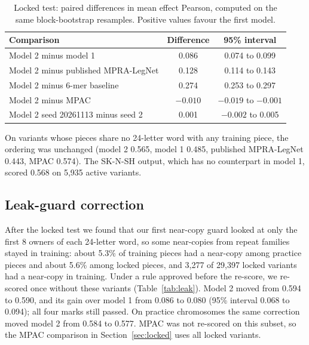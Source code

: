 \documentclass[11pt]{article}
\begin{document}
\begin{table}[tbp]
\centering
\caption{Locked test: paired differences in mean effect Pearson, computed on the same block-bootstrap resamples. Positive values favour the first model.}
\label{tab:diffs}
\small
\begin{tabular}{lcc}
\toprule
Comparison & Difference & 95\% interval \\
\midrule
Model 2 minus model 1 & 0.086 & 0.074 to 0.099 \\
Model 2 minus published MPRA-LegNet & 0.128 & 0.114 to 0.143 \\
Model 2 minus 6-mer baseline & 0.274 & 0.253 to 0.297 \\
Model 2 minus MPAC & $-0.010$ & $-0.019$ to $-0.001$ \\
Model 2 seed 20261113 minus seed 2 & 0.001 & $-0.002$ to 0.005 \\
\bottomrule
\end{tabular}
\end{table}

On variants whose pieces share no 24-letter word with any training piece, the ordering was unchanged (model 2 0.565, model 1 0.485, published MPRA-LegNet 0.443, MPAC 0.574). The SK-N-SH output, which has no counterpart in model 1, scored 0.568 on 5,935 active variants.

\subsection{Leak-guard correction}
\label{sec:leak}

After the locked test we found that our first near-copy guard looked at only the first 8 owners of each 24-letter word, so some near-copies from repeat families stayed in training: about 5.3\% of training pieces had a near-copy among practice pieces and about 5.6\% among locked pieces, and 3,277 of 29,397 locked variants had a near-copy in training. Under a rule approved before the re-score, we re-scored once without these variants (Table~\ref{tab:leak}). Model 2 moved from 0.594 to 0.590, and its gain over model 1 from 0.086 to 0.080 (95\% interval 0.068 to 0.094); all four marks still passed. On practice chromosomes the same correction moved model 2 from 0.584 to 0.577. MPAC was not re-scored on this subset, so the MPAC comparison in Section~\ref{sec:locked} uses all locked variants.
\end{document}
